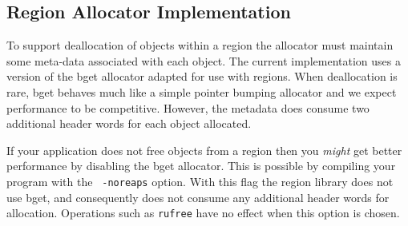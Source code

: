 \subsection{Region Allocator Implementation}

To support deallocation of objects within a region the allocator must
maintain some meta-data associated with each object. The current
implementation uses a version of the bget allocator adapted for use
with regions. When deallocation is rare, bget behaves much like a
simple pointer bumping allocator and we expect performance to be
competitive. However, the metadata does consume two additional header
words for each object allocated.

If your application does not free objects from a region then you
\emph{might} get better performance by disabling the bget
allocator. This is possible by compiling your program with the {\tt
-noreaps} option. With this flag the region library does not use bget,
and consequently does not consume any additional header words for
allocation. Operations such as {\tt rufree} have no effect when this
option is chosen.




